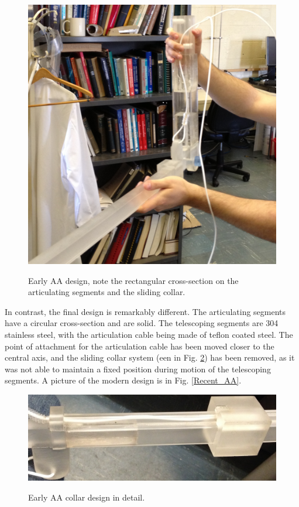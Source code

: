 \begin{figure}
\caption{Early AA design, note the rectangular cross-section on the articulating segments and the sliding collar.}
\includegraphics[width=\textwidth]{AA/Early_Design.jpg}
\label{Early Design}
\end{figure}

In contrast, the final design is remarkably different. The articulating segments have a circular cross-section and are solid. The telescoping segments are 304 stainless steel, with the articulation cable being made of teflon coated steel. The point of attachment for the articulation cable has been moved closer to the central axis, and the sliding collar system (een in Fig. \ref{Collar}) has been removed, as it was not able to maintain a fixed position during motion of the telescoping segments. A picture of the modern design is in Fig. \ref{Recent_AA}.

\begin{figure}
\caption{Early AA collar design in detail.}
\includegraphics[width=\textwidth]{AA/Collar.jpg}
\label{Collar}
\end{figure}


